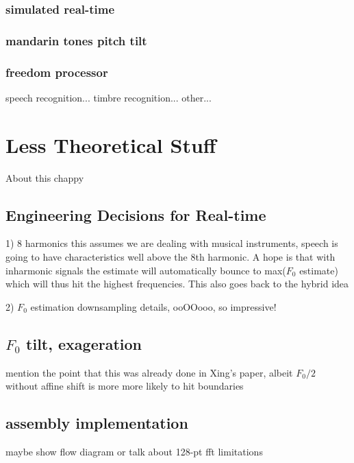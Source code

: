 \documentclass [11pt, proquest] {uwthesis}[2015/03/03]
\begin{document}
	\subsection{simulated real-time}
	
	\subsection{mandarin tones pitch tilt}
	
	\subsection{freedom processor}
		speech recognition...
		timbre recognition...
		other...


 
\chapter{Less Theoretical Stuff}

About this chappy

\section{Engineering Decisions for Real-time}

1) 8 harmonics
this assumes we are dealing with musical instruments, speech is going to have characteristics well above the 8th harmonic.  A hope is that with inharmonic signals the estimate will automatically bounce to max($F_0$ estimate) which will thus hit the highest frequencies.  This also goes back to the hybrid idea


2) $F_0$ estimation downsampling details, ooOOooo, so impressive!

\section{$F_0$ tilt, exageration}

mention the point that this was already done in Xing's paper, albeit $F_0/2$ without affine shift is more more likely to hit boundaries 

\section{assembly implementation}

maybe show flow diagram or talk about 128-pt fft limitations
\end{document}
